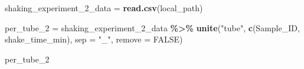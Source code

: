 \documentclass[
]{article}
\newenvironment{Shaded}{\begin{snugshade}}{\end{snugshade}}
\newcommand{\AttributeTok}[1]{\textcolor[rgb]{0.13,0.29,0.53}{#1}}
\newcommand{\ConstantTok}[1]{\textcolor[rgb]{0.56,0.35,0.01}{#1}}
\newcommand{\FunctionTok}[1]{\textcolor[rgb]{0.13,0.29,0.53}{\textbf{#1}}}
\newcommand{\NormalTok}[1]{#1}
\newcommand{\OtherTok}[1]{\textcolor[rgb]{0.56,0.35,0.01}{#1}}
\newcommand{\SpecialCharTok}[1]{\textcolor[rgb]{0.81,0.36,0.00}{\textbf{#1}}}
\newcommand{\StringTok}[1]{\textcolor[rgb]{0.31,0.60,0.02}{#1}}
\begin{document}
\begin{Shaded}
\begin{Highlighting}[]
\NormalTok{shaking\_experiment\_2\_data }\OtherTok{=} \FunctionTok{read.csv}\NormalTok{(local\_path)}
\end{Highlighting}
\end{Shaded}

\begin{Shaded}
\begin{Highlighting}[]
\NormalTok{per\_tube\_2 }\OtherTok{=}\NormalTok{ shaking\_experiment\_2\_data }\SpecialCharTok{\%\textgreater{}\%}
  \FunctionTok{unite}\NormalTok{(}\StringTok{"tube"}\NormalTok{, }\FunctionTok{c}\NormalTok{(Sample\_ID, shake\_time\_min), }\AttributeTok{sep =} \StringTok{"\_"}\NormalTok{, }\AttributeTok{remove =} \ConstantTok{FALSE}\NormalTok{)}

\NormalTok{per\_tube\_2}
\end{Highlighting}
\end{Shaded}
\end{document}
